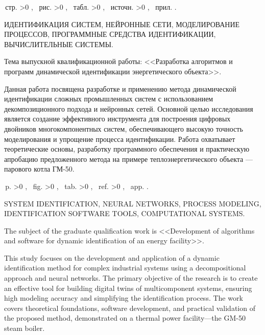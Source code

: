 \begin{Referat}

    \pageref{LastPage}\,стр.%
    \ifnum \totfig >0 , \totfig~рис.%
    \fi
    \ifnum \tottab >0 , \tottab~табл.%
    \fi
    \ifnum \totbib >0 , \totbib~источн.%
    \fi
    \ifnum \totapp >0 , \totapp~прил.%
    \else
    .%
    \fi

    ИДЕНТИФИКАЦИЯ СИСТЕМ, НЕЙРОННЫЕ СЕТИ, МОДЕЛИРОВАНИЕ ПРОЦЕССОВ, ПРОГРАММНЫЕ
    СРЕДСТВА ИДЕНТИФИКАЦИИ, ВЫЧИСЛИТЕЛЬНЫЕ СИСТЕМЫ.

    Тема выпускной квалификационной работы: <<Разработка алгоритмов и программ
    динамической идентификации энергетического объекта>>.

    Данная работа посвящена разработке и применению метода динамической
    идентификации сложных промышленных систем с использованием декомпозиционного
    подхода и нейронных сетей. Основной целью исследования является создание
    эффективного инструмента для построения цифровых двойников многокомпонентных
    систем, обеспечивающего высокую точность моделирования и упрощение процесса
    идентификации. Работа охватывает теоретические основы, разработку
    программного обеспечения и практическую апробацию предложенного метода на
    примере теплоэнергетического объекта — парового котла ГМ-50. 
    \nocite{*}

\end{Referat}



\begin{ReferatEng}

    \pageref{LastPage}\,p.%
    \ifnum \totfig >0 , \totfig~fig.%
    \fi
    \ifnum \tottab >0 , \tottab~tab.%
    \fi
    \ifnum \totbib >0 , \totbib~ref.%
    \fi
    \ifnum \totapp >0 , \totapp~app.%
    \else
    .%
    \fi

    SYSTEM IDENTIFICATION, NEURAL NETWORKS, PROCESS MODELING, IDENTIFICATION
    SOFTWARE TOOLS, COMPUTATIONAL SYSTEMS.

    The subject of the graduate qualification work is <<Development of
    algorithms and software for dynamic identification of an energy facility>>.

    This study focuses on the development and application of a dynamic
    identification method for complex industrial systems using a decompositional
    approach and neural networks. The primary objective of the research is to
    create an effective tool for building digital twins of multicomponent
    systems, ensuring high modeling accuracy and simplifying the identification
    process. The work covers theoretical foundations, software development, and
    practical validation of the proposed method, demonstrated on a thermal power
    facility—the GM-50 steam boiler.

\end{ReferatEng}
